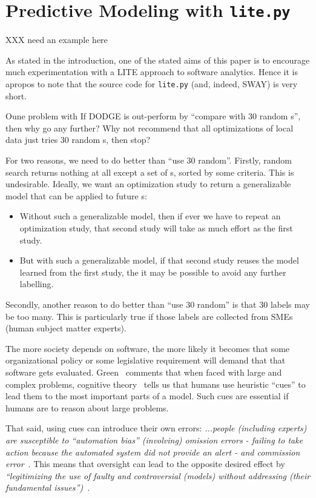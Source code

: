 \section{Predictive Modeling with {\tt lite.py}}

XXX need an example here

As stated in the introduction, one of the stated aims of this paper is to encourage much experimentation with a LITE approach to software analytics. Hence it is apropos to note that the source code for \verb+lite.py+ (and, indeed, SWAY)
is very short. 



Oune problem with 
If DODGE is out-perform by ``compare with 30 random {\eg}s'', then why go any further? Why not    recommend that all optimizations of local data just tries 30 random {\eg}s, then stop?

For two reasons, we need to do better than    ``use 30 random''. Firstly, random search  returns  nothing at all except a set of {\eg}s, sorted by some criteria.
This is undesirable.
Ideally, we want an optimization study to return    a generalizable model that can be applied to future {\eg}s:
\begin{itemize} 
\item Without such a generalizable model, then if ever we have to repeat an optimization study, that second study will take as much effort as the first study.
\item But with such a generalizable model, if that second study   reuses the model
learned from the first study, the it may be possible to avoid any further labelling.
\end{itemize}
Secondly, another reason to do better than ``use 30 random'' is that
  30 labels may be too many. This is
particularly true  if those labels are collected from 
SMEs (human subject matter experts).



 


 The more society depends on software, the more likely it becomes that some organizational policy or some legislative requirement will demand that
 that software gets evaluated. 
Green~\cite{green2022flaws}  comments that when faced with large and complex problems,
  cognitive theory~\cite{simon1956rational} tells us that humans use heuristic ``cues'' to lead them to the most important parts
of a model.   Such cues are essential if humans are to reason about large problems.   

That said,  using cues can introduce their own errors:
   {\em 
   ...people (including experts) are susceptible to ``automation bias'' (involving) omission errors - failing to take action because the automated system did not provide an alert - and commission error}~\cite{green2022flaws}.
 This means that oversight can lead to the opposite desired effect by {\em ``legitimizing the use of faulty and controversial (models) without addressing (their fundamental issues'')}~\cite{green2022flaws}. 

